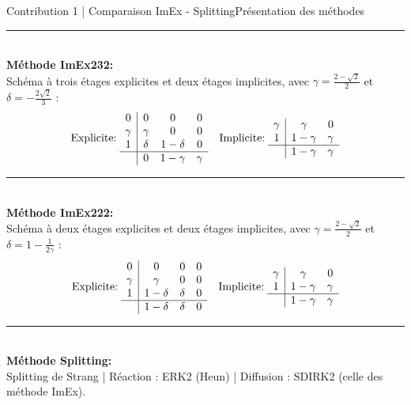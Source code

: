 \begin{frame}{Contribution 1 | Comparaison ImEx - Splitting}{Présentation des méthodes}

\noindent\color{Primary}\rule{\linewidth}{0.6pt}\color{black}\\
\textbf{Méthode ImEx232:\\}
Schéma à trois étages explicites et deux étages implicites, avec $\gamma = \tfrac{2-\sqrt{2}}{2}$ et $\delta = -\tfrac{2\sqrt{2}}{3}$ :
\[
\text{Explicite:}\;\begin{array}{c|ccc}
                        0 & 0 & 0 & 0\\
                        \gamma & \gamma & 0 & 0\\
                        1 & \delta & 1-\delta & 0\\ \hline
                        & 0 & 1-\gamma & \gamma
                    \end{array} \quad
\text{Implicite:}\;
                    \begin{array}{c|cc}
                        \gamma & \gamma & 0\\
                        1 & 1-\gamma & \gamma\\ \hline
                        & 1-\gamma & \gamma
                    \end{array}
\]
\pause
\noindent\color{Primary}\rule{\linewidth}{0.6pt}\color{black}\\
\textbf{Méthode ImEx222:\\}
Schéma à deux étages explicites et deux étages implicites, avec $\gamma = \tfrac{2-\sqrt{2}}{2}$ et $\delta = 1 - \tfrac{1}{2\gamma}$ :
\[
\text{Explicite:}\;
\begin{array}{c|ccc}
0 & 0 & 0 & 0\\
\gamma & \gamma & 0 & 0\\
1 & 1-\delta & \delta & 0\\ \hline
 & 1-\delta & \delta & 0
\end{array}
\quad
\text{Implicite:}\;
\begin{array}{c|cc}
\gamma & \gamma & 0\\
1 & 1-\gamma & \gamma\\ \hline
 & 1-\gamma & \gamma
\end{array}
\]
\pause
\noindent\color{Primary}\rule{\linewidth}{0.6pt}\color{black}\\
\textbf{Méthode Splitting:\\}
Splitting de Strang | Réaction : ERK2 (Heun) | Diffusion : SDIRK2 (celle des méthode ImEx).
\end{frame}
